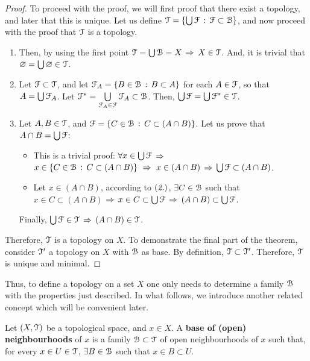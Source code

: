 \begin{proof}
	To proceed with the proof, we will first proof that there exist a topology, and later
	that this is unique.
	Let us define $\EuScript{T} = \{\bigcup \EuScript{F}\,:\,\EuScript{F}\subset \EuScript{B}\}$, and now proceed with the proof
	that $\EuScript{T}$ is a topology.
	\begin{enumerate}
		\item Then, by using the first point $\EuScript{T} =\bigcup \EuScript{B}= X$ $\Rightarrow$ $X\in \EuScript{T}$. And, it
		is trivial that $\varnothing = \bigcup \varnothing \in \EuScript{T}$.

		\item Let $\EuScript{F}\subset \EuScript{T}$, and let $\EuScript{F}_A=\{B\in \EuScript{B}\,:\, B\subset A\}$ for each
		$A\in\EuScript{F}$, so that $A=\bigcup\EuScript{F}_A$. Let $\EuScript{F}^*=\bigcup\limits_{\EuScript{F}_A\in\EuScript{F}}\EuScript{F}_A\subset\EuScript{B}$.
		Then,  $\bigcup \EuScript{F} =\bigcup\EuScript{F}^*\in\EuScript{T}$.

		\item Let $A, B\in \EuScript{T}$, and $\EuScript{F} = \{C\in\EuScript{B}\,:\, C \subset(A\cap B)\}$.
		Let us prove that $A\cap B = \bigcup\EuScript{F}$:
		\begin{itemize}
			\item[\boxed{\supseteq}] This is a trivial proof: $\forall x\in\bigcup\EuScript{F}$ $\Rightarrow$
			$x\in\left\{C\in\EuScript{B}\,:\,C\subset(A\cap B)\right\}\ \Rightarrow\ x\in (A\cap B)$ $\Rightarrow$
			$\bigcup\EuScript{F} \subset (A\cap B)$.
			\item[\boxed{\subseteq}] Let $x\in (A\cap B)$, according to $(\emph{2.})$,
			$\exists C\in \EuScript{B}$ such that $x\in C\subset (A\cap B)$ $\Rightarrow$ $x\in C\subset
			\bigcup\EuScript{F}$ $\Rightarrow$ $(A\cap B)\subset \bigcup\EuScript{F}$.
		\end{itemize}
		Finally, $\bigcup \EuScript{F}\in \EuScript{T}$ $\Rightarrow$ $(A\cap B) \in \EuScript{T}$.
	\end{enumerate}
	Therefore, $\EuScript{T}$ is a topology on $X$.
	To demonstrate the final part of the theorem, consider $\EuScript{T}'$ a topology on $X$ with
	$\EuScript{B}$ as base. By definition, $\EuScript{T}\subset \EuScript{T}'$. Therefore, $\EuScript{T}$ is unique and minimal.
\end{proof}

Thus, to define a topology on a set $X$ one only needs to determine a family $\EuScript{B}$ with
the properties just described.
In what follows, we introduce another related concept which will be convenient later.
\begin{definition}
	\label{def:base-open-neighbourhoods}
	Let $(X, \EuScript{T})$ be a topological space, and $x\in X$.
	A \textbf{base of (open) neighbourhoods} of $x$ is a family $\EuScript{B}\subset\EuScript{T}$ of open
	neighbourhoods of $x$ such that, for every $x\in U\in \EuScript{T}$, $\exists B\in\EuScript{B}$ such that
	$x\in B\subset U$.
\end{definition}

